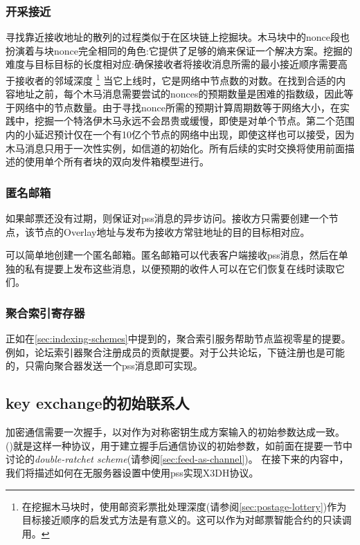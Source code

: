 \subsubsection{开采接近}

寻找靠近接收地址的散列的过程类似于在区块链上挖掘块。木马块中的nonce段也扮演着与块nonce完全相同的角色:它提供了足够的熵来保证一个解决方案。挖掘的难度与目标目标的长度相对应:确保接收者将接收消息所需的最小接近顺序需要高于接收者的邻域深度%
%
\footnote{在挖掘木马块时，使用邮资彩票批处理深度(请参阅\ref{sec:postage-lottery})作为目标接近顺序的启发式方法是有意义的。这可以作为对邮票智能合约的只读调用。}
%
当它上线时，它是网络中节点数的对数。在找到合适的内容地址之前，每个木马消息需要尝试的nonces的预期数量是困难的指数级，因此等于网络中的节点数量。由于寻找nonce所需的预期计算周期数等于网络大小，在实践中，挖掘一个特洛伊木马永远不会昂贵或缓慢，即使是对单个节点。第二个范围内的小延迟预计仅在一个有10亿个节点的网络中出现，即使这样也可以接受，因为木马消息只用于一次性实例，如信道的初始化。所有后续的实时交换将使用前面描述的使用单个所有者块的双向发件箱模型进行。


\subsubsection{匿名邮箱}

如果邮票还没有过期，则保证对pss消息的异步访问。接收方只需要创建一个节点，该节点的Overlay地址与发布为接收方常驻地址的目的目标相对应。

可以简单地创建一个匿名邮箱。匿名邮箱可以代表客户端接收pss消息，然后在单独的私有提要上发布这些消息，以便预期的收件人可以在它们恢复在线时读取它们。

\subsubsection{聚合索引寄存器}

正如在\ref{sec:indexing-schemes}中提到的，聚合索引服务帮助节点监视零星的提要。例如，论坛索引器聚合注册成员的贡献提要。对于公共论坛，下链注册也是可能的，只需向聚合器发送一个pss消息即可实现。 


\subsection{key exchange的初始联系人\statusgreen}\label{sec:pss-key-exchange}


加密通信需要一次握手，以对作为对称密钥生成方案输入的初始参数达成一致。 ()就是这样一种协议\cite{marlinspike2016x3dh}，用于建立握手后通信协议的初始参数，如前面在提要一节中讨论的\emph{double-ratchet scheme}(请参阅\ref{sec:feed-as-channel})。
在接下来的内容中，我们将描述如何在无服务器设置中使用pss实现X3DH协议。

